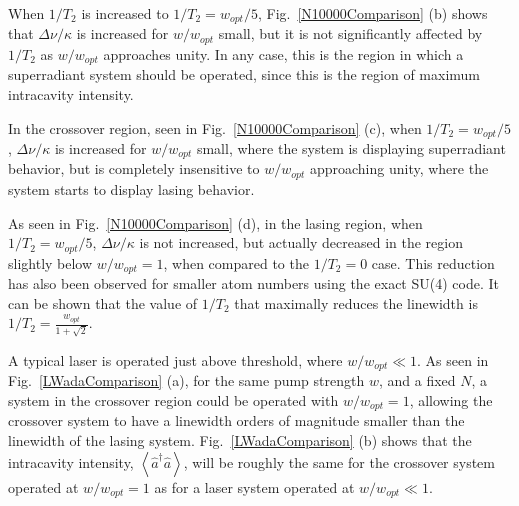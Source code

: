 \documentclass[aps,
twocolumn,
superscriptaddress,groupedaddress]{revtex4}
\begin{document}
When $1/T_2$ is increased to $1/T_2=w_{opt}/5$,
Fig.~\ref{N10000Comparison} (b) shows that $\Delta \nu/\kappa$ is
increased for $w/w_{opt}$ small, but it is not significantly affected by
$1/T_2$ as $w/w_{opt}$ approaches unity. In any case, this is the region
in which a superradiant system should be operated, since this is the
region of maximum intracavity intensity.

In the crossover region, seen in Fig.~\ref{N10000Comparison} (c), when
$1/T_2=w_{opt}/5$, $\Delta \nu/\kappa$ is increased for $w/w_{opt}$
small, where the system is displaying superradiant behavior, but is
completely insensitive to $w/w_{opt}$ approaching unity, where the
system starts to display lasing behavior.

As seen in Fig.~\ref{N10000Comparison} (d), in the lasing region, when
$1/T_2=w_{opt}/5$, $\Delta \nu/\kappa$ is not increased, but actually
decreased in the region slightly below $w/w_{opt}=1$, when compared to
the $1/T_2=0$ case. This reduction has also been observed for smaller
atom numbers using the exact SU(4) code. It can be shown that the value
of $1/T_2$ that maximally reduces the linewidth is
$1/T_2=\frac{w_{opt}}{1+\sqrt{2}}$.

A typical laser is operated just above threshold, where $w/w_{opt} \ll
1$. As seen in Fig.~\ref{LWadaComparison} (a), for the same pump
strength $w$, and a fixed $N$, a system in the crossover region could be
operated with $w/w_{opt} = 1$, allowing the crossover system to have a
linewidth orders of magnitude smaller than the linewidth of the lasing
system. Fig.~\ref{LWadaComparison} (b) shows that the intracavity
intensity, $\left<\hat{a}^{\dagger}\hat{a}\right>$, will be roughly the
same for the crossover system operated at $w/w_{opt} = 1$ as for a laser
system operated at  $w/w_{opt} \ll 1$.
\end{document}

